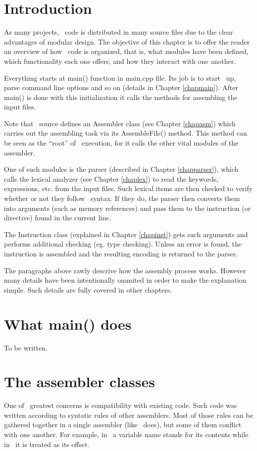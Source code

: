 \documentclass[a4paper,draft,12pt]{book}
\begin{document}
\chapter{Introduction}
As many projects, \popasm\ code is distributed in many source files
due to the clear advantages of modular design. The objective of this
chapter is to offer the reader an overview of how \popasm\ code is
organized, that is, what modules have been defined, which functionality
each one offers, and how they interact with one another.

Everything starts at main() function in main.cpp file. Its job is to
start \popasm\ up, parse command line options and so on (details in
Chapter \ref{chapmain}). After main() is done with this initialization
it calls the methods for assembling the input files.

Note that \popasm\ source defines an Assembler class (see Chapter
\ref{chapasm}) which carries out the assembling task via its
AssembleFile() method. This method can be seen as the ``root'' of
\popasm\ execution, for it calls the other vital modules of the
assembler.

One of such modules is the parser (described in Chapter \ref{chapparser}),
which calls the lexical analyzer (see Chapter \ref{chaplex}) to read
the keywords, expressions, etc. from the input files. Such lexical
items are then checked to verify whether or not they follow \popasm\ 
syntax. If they do, the parser then converts them into arguments
(such as memory references) and pass them to the instruction (or
directive) found in the current line.

The Instruction class (explained in Chapter \ref{chapinst}) gets such
arguments and performs additional checking (eg. type checking). Unless
an error is found, the instruction is assembled and the resulting encoding
is returned to the parser.

The paragraphs above rawly descrive how the assembly process works.
However many details have been intentionally ommited in order to
make the explanation simple. Such details are fully covered in other
chapters.

\chapter{What main() does\label{chapmain}}
To be written.

\chapter{The assembler classes\label{chapasm}}
One of \popasm\ greatest concerns is compatibility with existing code.
Such code was written according to syntatic rules of other assemblers.
Most of those rules can be gathered together in a single
assembler (like \popasm\ does), but some of them conflict with one
another. For example, in \tasm\ a variable name stands for its contents
while in \nasm\ it is treated as its offset.
\end{document}
